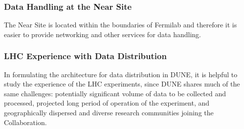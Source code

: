 \subsubsection{Data Handling at the Near Site}
The Near Site is located within the boundaries of Fermilab and therefore it is easier to provide networking and other services for data handling.


\subsubsection{LHC Experience with Data Distribution}

In formulating the architecture for data distribution in DUNE, it is helpful to study the experience of the LHC experiments,
since DUNE shares much of the same challenges: potentially significant  volume of data to be collected and processed,
projected long period of operation of the experiment, and geographically dispersed and diverse research communities joining the Collaboration.

